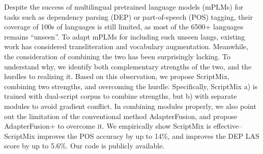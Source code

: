 Despite the success of multilingual pretrained language models (mPLMs) for tasks such as dependency parsing (DEP) or part-of-speech (POS) tagging, their coverage of 100s of languages is still limited, as most of the 6500+ languages remains ``unseen''. To adapt mPLMs for including such unseen langs, existing work has considered transliteration and vocabulary augmentation. Meanwhile, the consideration of combining the two has been surprisingly lacking. To understand why, we identify both complementary strengths of the two, and the hurdles to realizing it. Based on this observation, we propose ScriptMix, combining two strengths, and overcoming the hurdle. Specifically, ScriptMix a) is trained with dual-script corpus to combine strengths, but b) with separate modules to avoid gradient conflict. In combining modules properly, we also point out the limitation of the conventional method AdapterFusion, and propose AdapterFusion+ to overcome it. We empirically show ScriptMix is effective-- ScriptMix improves the POS accuracy by up to 14\%, and improves the DEP LAS score by up to 5.6\%. Our code is publicly available.